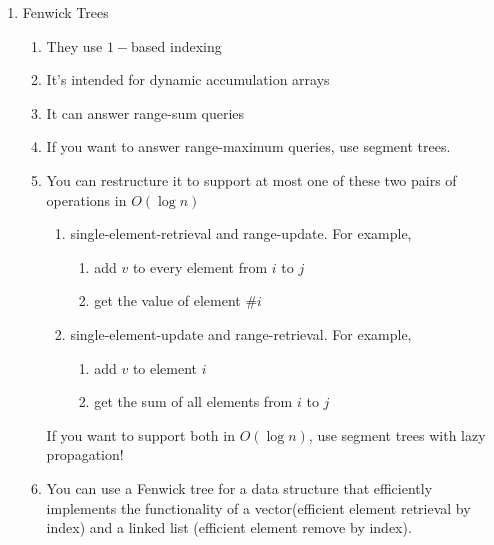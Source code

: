 \documentclass[12pt]{book}
\begin{document}
\begin{enumerate}
\item Fenwick Trees
\begin{enumerate}
\item They use $1-$based indexing
\item It's intended for dynamic accumulation arrays
\item It can answer range-sum queries
\item If you want to answer range-maximum queries, use segment trees.
\item You can restructure it to support at most one of these two pairs of operations in $O(\log n)$
\begin{enumerate}
\item single-element-retrieval and range-update. For example,
\begin{enumerate}
\item add $v$ to every element from $i$ to $j$
\item get the value of element $\#i$
\end{enumerate}
\item single-element-update and range-retrieval. For example,
\begin{enumerate}
\item add $v$ to element $i$
\item get the sum of all elements from $i$ to $j$
\end{enumerate}
\end{enumerate}
If you want to support both in $O(\log n)$, use segment trees with lazy propagation!
\item You can use a Fenwick tree for a data structure that efficiently implements the functionality of a vector(efficient element retrieval by index) and a linked list (efficient element remove by index).
\end{enumerate}


\end{enumerate}
\end{document}
